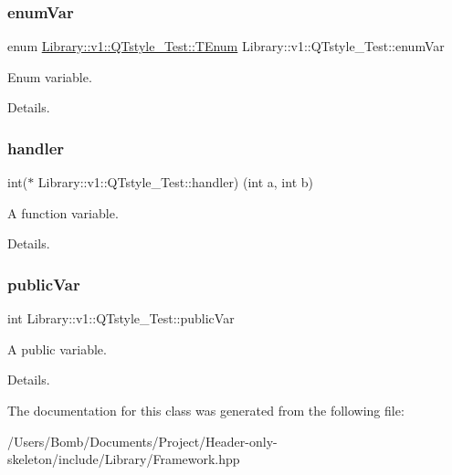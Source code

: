 \subsubsection{\texorpdfstring{enum\+Var}{enumVar}}
{\footnotesize\ttfamily enum \mbox{\hyperlink{class_library_1_1v1_1_1_q_tstyle___test_ac4bc26cc9920a5addfcea6c9f88e10bf}{Library\+::v1\+::\+Q\+Tstyle\+\_\+\+Test\+::\+T\+Enum}}
                 Library\+::v1\+::\+Q\+Tstyle\+\_\+\+Test\+::enum\+Var}



Enum variable. 

Details. \mbox{\label{class_library_1_1v1_1_1_q_tstyle___test_abf53a8cc936f2592a3110953432076a6}} 
\subsubsection{\texorpdfstring{handler}{handler}}
{\footnotesize\ttfamily int($\ast$ Library\+::v1\+::\+Q\+Tstyle\+\_\+\+Test\+::handler) (int a, int b)}



A function variable. 

Details. \mbox{\label{class_library_1_1v1_1_1_q_tstyle___test_aeaa1f30fff77bfdd45cda39f6b059fc0}} 
\subsubsection{\texorpdfstring{public\+Var}{publicVar}}
{\footnotesize\ttfamily int Library\+::v1\+::\+Q\+Tstyle\+\_\+\+Test\+::public\+Var}



A public variable. 

Details. 

The documentation for this class was generated from the following file\+:\begin{DoxyCompactItemize}
\item 
/\+Users/\+Bomb/\+Documents/\+Project/\+Header-\/only-\/skeleton/include/\+Library/Framework.\+hpp\end{DoxyCompactItemize}
